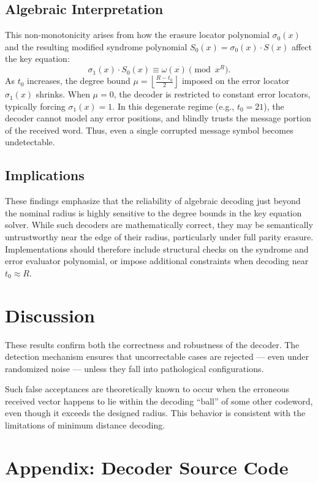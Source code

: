 \documentclass[11pt]{article}
\begin{document}
\subsection{Algebraic Interpretation}
This non-monotonicity arises from how the erasure locator polynomial \( \sigma_0(x) \) and the resulting modified syndrome polynomial \( S_0(x) = \sigma_0(x) \cdot S(x) \) affect the key equation:
\[
\sigma_1(x) \cdot S_0(x) \equiv \omega(x) \pmod{x^R}.
\]
As \( t_0 \) increases, the degree bound \( \mu = \left\lfloor \frac{R - t_0}{2} \right\rfloor \) imposed on the error locator \( \sigma_1(x) \) shrinks. When \( \mu = 0 \), the decoder is restricted to constant error locators, typically forcing \( \sigma_1(x) = 1 \). In this degenerate regime (e.g., \( t_0 = 21 \)), the decoder cannot model any error positions, and blindly trusts the message portion of the received word. Thus, even a single corrupted message symbol becomes undetectable.


\subsection{Implications}
These findings emphasize that the reliability of algebraic decoding just beyond the nominal radius is highly sensitive to the degree bounds in the key equation solver. While such decoders are mathematically correct, they may be semantically untrustworthy near the edge of their radius, particularly under full parity erasure. Implementations should therefore include structural checks on the syndrome and error evaluator polynomial, or impose additional constraints when decoding near \( t_0 \approx R \).


\section{Discussion}
These results confirm both the correctness and robustness of the decoder. The detection mechanism ensures that uncorrectable cases are rejected — even under randomized noise — unless they fall into pathological configurations.

Such false acceptances are theoretically known to occur when the erroneous received vector happens to lie within the decoding “ball” of some other codeword, even though it exceeds the designed radius. This behavior is consistent with the limitations of minimum distance decoding.


\appendix
\section*{Appendix: Decoder Source Code}
\lstset{basicstyle=\ttfamily\small, breaklines=true}

\end{document}
